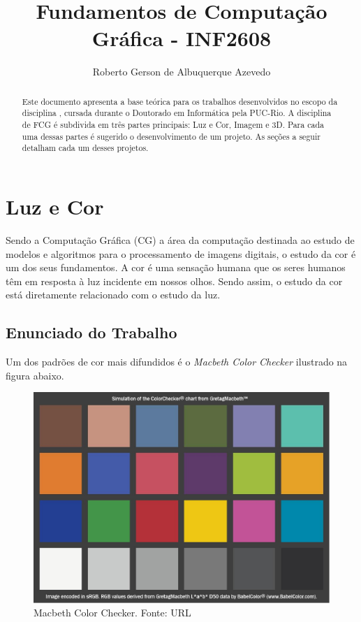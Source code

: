 \documentclass[a4paper,10pt]{report}
\title{Fundamentos de Computação Gráfica - INF2608}
\author{Roberto Gerson de Albuquerque Azevedo}
\begin{document}
\maketitle

\begin{abstract}
Este documento apresenta a base teórica para os trabalhos desenvolvidos no
escopo da disciplina , cursada
durante o Doutorado em Informática pela PUC-Rio. A disciplina de FCG é subdivida
em três partes principais: Luz e Cor, Imagem e 3D. Para cada uma dessas partes é
sugerido o desenvolvimento de um projeto. As seções a seguir detalham cada um
desses projetos.
\end{abstract}

\chapter{Luz e Cor}
\par
Sendo a Computação Gráfica (CG) a área da computação destinada ao estudo de
modelos e algoritmos para o processamento de imagens digitais, o estudo da cor é
um dos seus fundamentos. A cor é uma sensação humana que os seres humanos têm
em resposta à luz incidente em nossos olhos. Sendo assim, o estudo da cor está
diretamente relacionado com o estudo da luz.

\par

\section{Enunciado do Trabalho}
\par
Um dos padrões de cor mais difundidos é o \textit{Macbeth Color Checker}
ilustrado na figura abaixo.

\begin{figure}[!htb]
     \centering
     \includegraphics[scale=0.4]{img/colorChecker.jpg}
     \caption{Macbeth Color Checker. Fonte: URL}
     \label{Label de referência para a imagem}
\end{figure}
\end{document}
